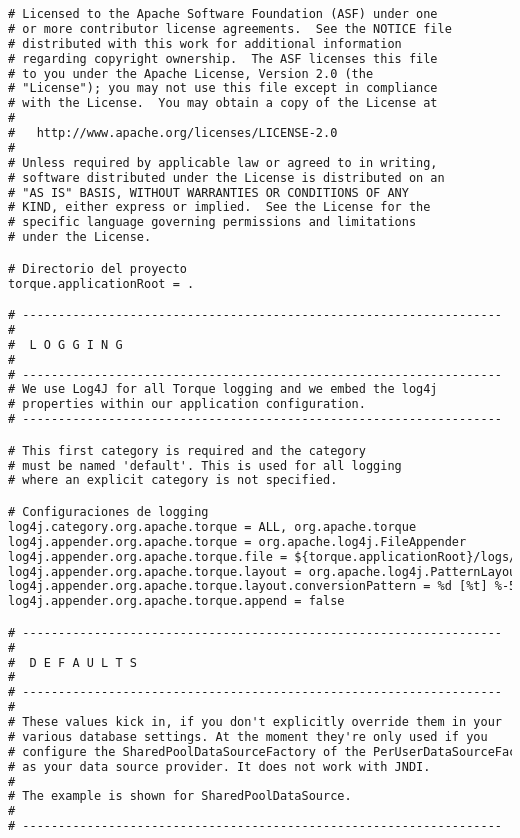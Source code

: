 \begin{lstlisting}[language=xml]
# Licensed to the Apache Software Foundation (ASF) under one
# or more contributor license agreements.  See the NOTICE file
# distributed with this work for additional information
# regarding copyright ownership.  The ASF licenses this file
# to you under the Apache License, Version 2.0 (the
# "License"); you may not use this file except in compliance
# with the License.  You may obtain a copy of the License at
#
#   http://www.apache.org/licenses/LICENSE-2.0
#
# Unless required by applicable law or agreed to in writing,
# software distributed under the License is distributed on an
# "AS IS" BASIS, WITHOUT WARRANTIES OR CONDITIONS OF ANY
# KIND, either express or implied.  See the License for the
# specific language governing permissions and limitations
# under the License.

# Directorio del proyecto
torque.applicationRoot = .

# -------------------------------------------------------------------
#
#  L O G G I N G
#
# -------------------------------------------------------------------
# We use Log4J for all Torque logging and we embed the log4j
# properties within our application configuration.
# -------------------------------------------------------------------

# This first category is required and the category
# must be named 'default'. This is used for all logging
# where an explicit category is not specified.

# Configuraciones de logging
log4j.category.org.apache.torque = ALL, org.apache.torque
log4j.appender.org.apache.torque = org.apache.log4j.FileAppender
log4j.appender.org.apache.torque.file = ${torque.applicationRoot}/logs/torque.log
log4j.appender.org.apache.torque.layout = org.apache.log4j.PatternLayout
log4j.appender.org.apache.torque.layout.conversionPattern = %d [%t] %-5p %c - %m%n
log4j.appender.org.apache.torque.append = false

# -------------------------------------------------------------------
#
#  D E F A U L T S
#
# -------------------------------------------------------------------
#
# These values kick in, if you don't explicitly override them in your
# various database settings. At the moment they're only used if you
# configure the SharedPoolDataSourceFactory of the PerUserDataSourceFactory
# as your data source provider. It does not work with JNDI.
#
# The example is shown for SharedPoolDataSource.
#
# -------------------------------------------------------------------


\end{lstlisting}
